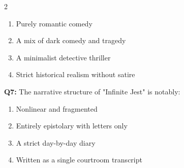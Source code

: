 \documentclass[10pt]{article}
\begin{document}
\begin{multicols}{2}
\begin{enumerate}[label=\arabic*.]
\item Purely romantic comedy
\item A mix of dark comedy and tragedy
\item A minimalist detective thriller
\item Strict historical realism without satire
\end{enumerate}
\textbf{Q7:} The narrative structure of "Infinite Jest" is notably:

\begin{enumerate}[label=\arabic*.]
\item Nonlinear and fragmented
\item Entirely epistolary with letters only
\item A strict day-by-day diary
\item Written as a single courtroom transcript
\end{enumerate}
\end{multicols}

\newpage
\end{document}
